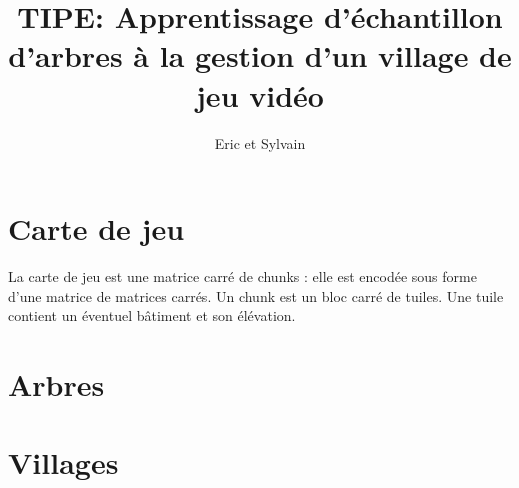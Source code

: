 \documentclass{article}
\title{TIPE: Apprentissage d'échantillon d'arbres à la gestion d'un village de jeu vidéo}
\author{Eric et Sylvain}
\date{}
\begin{document}
\maketitle
\tableofcontents
\newpage

\section{Carte de jeu}

La carte de jeu est une matrice carré de chunks : elle est encodée sous forme d'une matrice de matrices carrés. Un chunk est un bloc carré de tuiles. Une tuile contient un éventuel bâtiment et son élévation. 

\section{Arbres}

\section{Villages}
\end{document}
